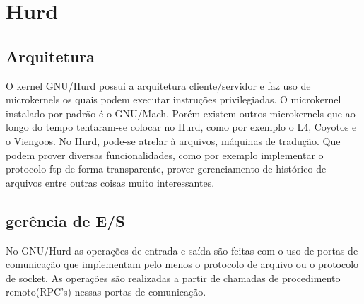 \documentclass[conference]{IEEEtran}
\begin{document}
\section{Hurd}\label{sec:Hurd}

\subsection{Arquitetura}\label{sec:HurdArq}
O kernel GNU/Hurd possui a arquitetura cliente/servidor e faz uso de microkernels os quais podem executar instruções privilegiadas. O microkernel instalado por padrão é o GNU/Mach. Porém existem outros microkernels que ao longo do tempo tentaram-se colocar no Hurd, como por exemplo o L4, Coyotos e o Viengoos. No Hurd, pode-se atrelar à arquivos, máquinas de tradução. Que podem prover diversas funcionalidades, como por exemplo implementar o protocolo ftp de forma transparente, prover gerenciamento de histórico de arquivos entre outras coisas muito interessantes.\cite{HurdPaper}

\subsection{gerência de E/S}\label{sec:HurdES}
No GNU/Hurd as operações de entrada e saída são feitas com o uso de portas de comunicação que implementam pelo menos o protocolo de arquivo ou o protocolo de socket. As operações são realizadas a partir de chamadas de procedimento remoto(RPC's) nessas portas de comunicação\cite{HurdIO}.
\end{document}
